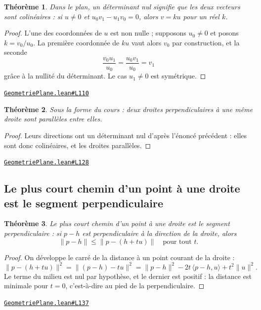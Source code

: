 \documentclass[11pt,a4paper]{article}
\theoremstyle{definition}
\theoremstyle{plain}
\newtheorem{theoreme}{Théorème}
\newcommand{\source}[2]{\par\smallskip\noindent\hfill{\footnotesize\href{#1}{\texttt{#2}}}\par\smallskip}
\begin{document}
\begin{theoreme}
Dans le plan, un déterminant nul signifie que les deux vecteurs sont colinéaires : si
$u \ne 0$ et $u_0 v_1 - u_1 v_0 = 0$, alors $v = ku$ pour un réel $k$.
\end{theoreme}

\begin{proof}
L'une des coordonnées de $u$ est non nulle ; supposons $u_0 \ne 0$ et posons
$k = v_0/u_0$. La première coordonnée de $ku$ vaut alors $v_0$ par construction, et la
seconde
\[ \frac{v_0 u_1}{u_0} = \frac{u_0 v_1}{u_0} = v_1 \]
grâce à la nullité du déterminant. Le cas $u_1 \ne 0$ est symétrique.
\end{proof}
\source{https://github.com/Commutator-IO/learn-lean/blob/main/courses/01-college/02-geometrie-plane/GeometriePlane.lean\#L110}{GeometriePlane.lean\#L110}

\begin{theoreme}
Sous la forme du cours : deux droites perpendiculaires à une même droite sont
parallèles entre elles.
\end{theoreme}

\begin{proof}
Leurs directions ont un déterminant nul d'après l'énoncé précédent : elles sont donc
colinéaires, et les droites parallèles.
\end{proof}
\source{https://github.com/Commutator-IO/learn-lean/blob/main/courses/01-college/02-geometrie-plane/GeometriePlane.lean\#L128}{GeometriePlane.lean\#L128}

\subsection{Le plus court chemin d'un point à une droite est le segment perpendiculaire}

\begin{theoreme}
Le plus court chemin d'un point à une droite est le segment perpendiculaire : si
$p - h$ est perpendiculaire à la direction de la droite, alors
\[ \|p - h\| \le \|p - (h + tu)\| \quad \text{pour tout } t . \]
\end{theoreme}

\begin{proof}
On développe le carré de la distance à un point courant de la droite :
\[ \|p - (h + tu)\|^2 = \|(p - h) - tu\|^2
   = \|p - h\|^2 - 2t\,\langle p - h, u\rangle + t^2\|u\|^2 . \]
Le terme du milieu est nul par hypothèse, et le dernier est positif : la distance est
minimale pour $t = 0$, c'est-à-dire au pied de la perpendiculaire.
\end{proof}
\source{https://github.com/Commutator-IO/learn-lean/blob/main/courses/01-college/02-geometrie-plane/GeometriePlane.lean\#L137}{GeometriePlane.lean\#L137}
\end{document}
